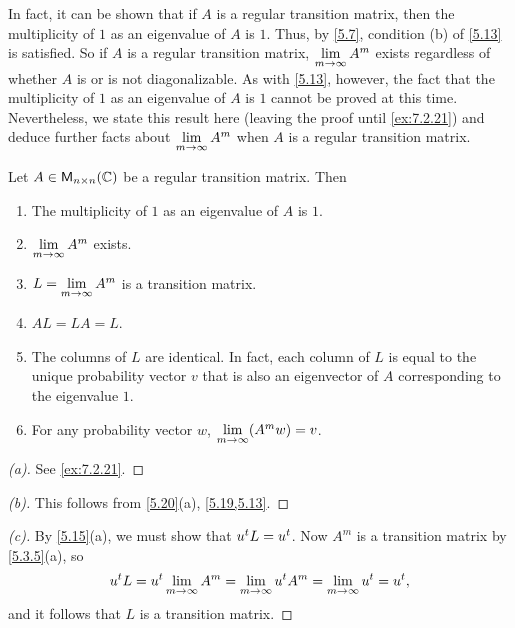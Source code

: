 \begin{note}
  In fact, it can be shown that if \(A\) is a regular transition matrix, then the multiplicity of \(1\) as an eigenvalue of \(A\) is \(1\).
  Thus, by \cref{5.7}, condition (b) of \cref{5.13} is satisfied.
  So if \(A\) is a regular transition matrix, \(\lim\limits_{m \to \infty} A^m\) exists regardless of whether \(A\) is or is not diagonalizable.
  As with \cref{5.13}, however, the fact that the multiplicity of \(1\) as an eigenvalue of \(A\) is \(1\) cannot be proved at this time.
  Nevertheless, we state this result here (leaving the proof until \cref{ex:7.2.21}) and deduce further facts about \(\lim\limits_{m \to \infty} A^m\) when \(A\) is a regular transition matrix.
\end{note}

\begin{thm}\label{5.20}
  Let \(A \in \ms[n][n][\C]\) be a regular transition matrix.
  Then
  \begin{enumerate}
    \item The multiplicity of \(1\) as an eigenvalue of \(A\) is \(1\).
    \item \(\lim\limits_{m \to \infty} A^m\) exists.
    \item \(L = \lim\limits_{m \to \infty} A^m\) is a transition matrix.
    \item \(AL = LA = L\).
    \item The columns of \(L\) are identical.
          In fact, each column of \(L\) is equal to the unique probability vector \(v\) that is also an eigenvector of \(A\) corresponding to the eigenvalue \(1\).
    \item For any probability vector \(w\), \(\lim\limits_{m \to \infty} (A^m w) = v\).
  \end{enumerate}
\end{thm}

\begin{proof}[(a)]
  See \cref{ex:7.2.21}.
\end{proof}

\begin{proof}[(b)]
  This follows from \cref{5.20}(a), \cref{5.19,5.13}.
\end{proof}

\begin{proof}[(c)]
  By \cref{5.15}(a), we must show that \({u}^{t} L = {u}^{t}\).
  Now \(A^m\) is a transition matrix by \cref{5.3.5}(a), so
  \[
    {u}^{t} L = {u}^{t} \lim\limits_{m \to \infty} A^m = \lim\limits_{m \to \infty} {u}^{t} A^m = \lim\limits_{m \to \infty} {u}^{t} = {u}^{t},
  \]
  and it follows that \(L\) is a transition matrix.
\end{proof}

